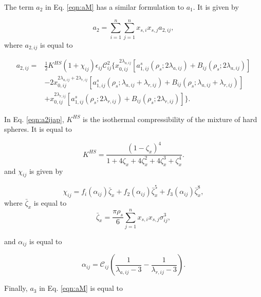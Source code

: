The term $a_{2}$ in Eq. \ref{eqn:aM} has a similar formulation to $a_{1}$. It is given by

\begin{equation}
a_{2} = \sum_{i=1}^{n} \sum_{j=1}^{n} x_{s,i} x_{s,j} a_{2,ij},
\end{equation}	
where $a_{2,ij}$ is equal to

\begin{equation}
\begin{aligned}
a_{2,ij} {}=&  \frac{1}{2} K^{HS} (1+ \chi_{ij}) \epsilon_{ij} \mathcal{C}_{ij}^2 \lbrace x_{0,ij}^{2\lambda _{a,ij}} [a_{1,ij}^{s}(\rho _{s}; 2\lambda _{a,ij}) + B_{ij}(\rho _{s}; 2\lambda _{a,ij})] \\
& - 2x_{0,ij}^{2\lambda _{a,ij} + 2\lambda _{r,ij}} [a_{1,ij}^{s}(\rho _{s}; \lambda _{a,ij} + \lambda _{r,ij}) + B_{ij}(\rho _{s}; \lambda _{a,ij} + \lambda _{r,ij})] \\
& +  x_{0,ij}^{2\lambda _{r,ij}} [a_{1,ij}^{s}(\rho _{s}; 2\lambda _{r,ij}) + B_{ij}(\rho _{s}; 2\lambda _{r,ij})] \rbrace.
\end{aligned}
\label{eqn:a2ijap}
\end{equation}

In Eq. \ref{eqn:a2ijap}, $K^{HS}$ is the isothermal compressibility of the mixture of hard spheres. It is equal to

\begin{equation}
K^{HS} = \dfrac{(1-\zeta_{x})^{4}}{1+4 \zeta_{x}+4 \zeta_{x}^{2}+4 \zeta_{x}^{3}+\zeta_{x}^{4}}.
\end{equation}
and $\chi_{ij}$ is given by

\begin{equation}
\chi_{ij} = f_{i}(\alpha_{ij}) \bar{\zeta}_{x} + f_{2}(\alpha_{ij}) \bar{\zeta}_{x}^{5} + f_{3}(\alpha_{ij}) \bar{\zeta}_{x}^{8},
\end{equation}
where $\bar{\zeta}_{x}$ is equal to
\begin{equation}
\bar{\zeta}_{x} = \frac{\pi \rho _{s}}{6} \sum_{j=1}^{n} x_{s,i} x_{s,j} \sigma_{ij}^{3},
\end{equation}

and $\alpha_{ij}$ is equal to

\begin{equation}
\alpha_{ij} = \mathcal{C}_{ij} \left(\frac{1}{\lambda_{a,ij}-3} - \frac{1}{\lambda_{r,ij}-3} \right).
\end{equation}

Finally, $a_{3}$  in Eq. \ref{eqn:aM} is equal to

